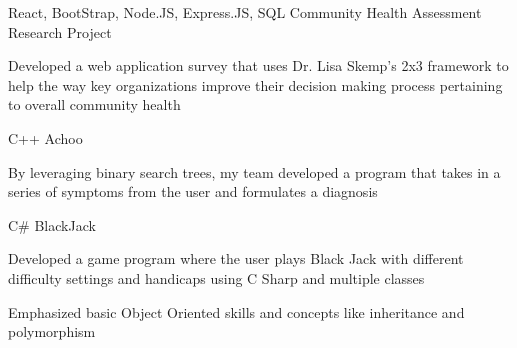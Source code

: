 \begin{cventries}
  \cventry
    {React, BootStrap, Node.JS, Express.JS, SQL}
    {Community Health Assessment Research Project}
    {}
    {}
    {
      \begin{cvitems}
        \item {Developed a web application survey that uses Dr. Lisa Skemp's 2x3 framework to help the way key organizations improve their decision making process pertaining to overall community health}
      \end{cvitems}
    }\cventry
    {C++}
    {Achoo}
    {}
    {}
    {
      \begin{cvitems}
        \item {By leveraging binary search trees, my team developed a program that takes in a series of symptoms from the user and formulates a diagnosis}
      \end{cvitems}
      }\cventry
    {C\#}
    {BlackJack}
    {}
    {}
    {
      \begin{cvitems}
        \item {Developed a game program where the user plays Black Jack with different difficulty settings and handicaps using C Sharp and multiple classes}
        \item {Emphasized basic Object Oriented skills and concepts like inheritance and polymorphism}
      \end{cvitems}
    }
\end{cventries}
